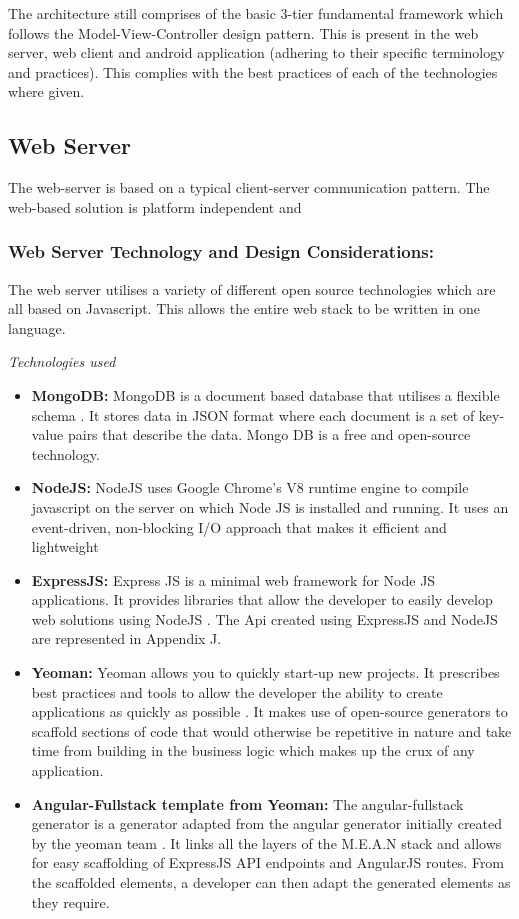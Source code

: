 \documentclass[12pt]{witseiepaper}
\begin{document}
The architecture still comprises of the basic 3-tier fundamental framework which follows the Model-View-Controller design pattern. This is present in the web server, web client and android application (adhering to their specific terminology and practices). This complies with the best practices of each of the technologies where given.


\subsection{Web Server}
The web-server is based on a typical client-server communication pattern. The web-based solution is platform independent and 
\subsubsection{Web Server Technology and Design Considerations:} 
The web server utilises a variety of different open source technologies which are all based on Javascript. This allows the entire web stack to be written in one language.

\textit{Technologies used}
\begin{itemize}
  \item \textbf{MongoDB:} MongoDB is a document based database that utilises a flexible schema \cite{MongoDB}. It stores data in JSON format where each document is a set of key-value pairs that describe the data. Mongo DB is a free and open-source technology.
  \item \textbf{NodeJS:} NodeJS uses Google Chrome's V8 runtime engine to compile javascript on the server on which Node JS is installed and running. It uses an event-driven, non-blocking I/O approach that makes it efficient and lightweight \cite{NodeJS}
  \item \textbf{ExpressJS:} Express JS is a minimal web framework for Node JS applications. It provides libraries that allow the developer to easily develop web solutions using NodeJS \cite{ExpressJS}. The Api created using ExpressJS and NodeJS are represented in Appendix J.
  \item \textbf{Yeoman:} Yeoman allows you to quickly start-up new projects. It prescribes best practices and tools to allow the developer the ability to create applications as quickly as possible \cite{Yeoman}. It makes use of open-source generators to scaffold sections of code that would otherwise be repetitive in nature and take time from building in the business logic which makes up the crux of any application.
  \item \textbf{Angular-Fullstack template from Yeoman:} The angular-fullstack generator is a generator adapted from the angular generator initially created by the yeoman team \cite{AngularFullstack}. It links all the layers of the M.E.A.N stack and allows for easy scaffolding of ExpressJS API endpoints and AngularJS routes. From the scaffolded elements, a developer can then adapt the generated elements as they require.
\end{itemize}
\end{document}

